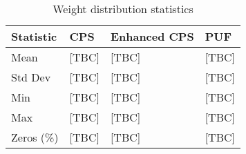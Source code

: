 \begin{table}[h]
    \centering
    \caption{Weight distribution statistics}
    \label{tab:weight_stats}
    \begin{tabular}{llll}
    \toprule
    Statistic & CPS & Enhanced CPS & PUF \\
    \midrule
    Mean & [TBC] & [TBC] & [TBC] \\
    Std Dev & [TBC] & [TBC] & [TBC] \\
    Min & [TBC] & [TBC] & [TBC] \\
    Max & [TBC] & [TBC] & [TBC] \\
    Zeros (\%) & [TBC] & [TBC] & [TBC] \\
    \bottomrule
    \end{tabular}
\end{table}
